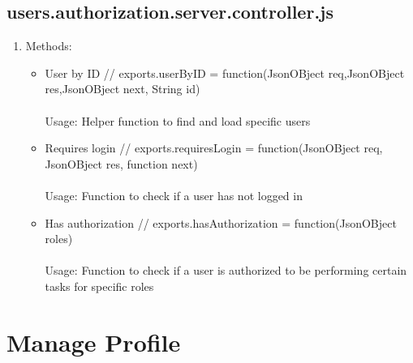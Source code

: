 \documentclass[a4paper,12pt]{article}
\begin{document}
\subsection{users.authorization.server.controller.js}
\begin{enumerate}
\item Methods: 
	\begin{itemize}
		\item User by ID // exports.userByID = function(JsonOBject req,JsonOBject res,JsonOBject next, String id)
		\\ \\ Usage: Helper function to find and load specific users
		\item Requires login // exports.requiresLogin = function(JsonOBject req, JsonOBject res, function next) 
		\\ \\ Usage: Function to check if a user has not logged in
		\item Has authorization // exports.hasAuthorization = function(JsonOBject roles)
		\\ \\ Usage: Function to check if a user is authorized to be performing certain tasks for specific roles
	\end{itemize}

\end{enumerate}


\section{Manage Profile} 
\end{document}
